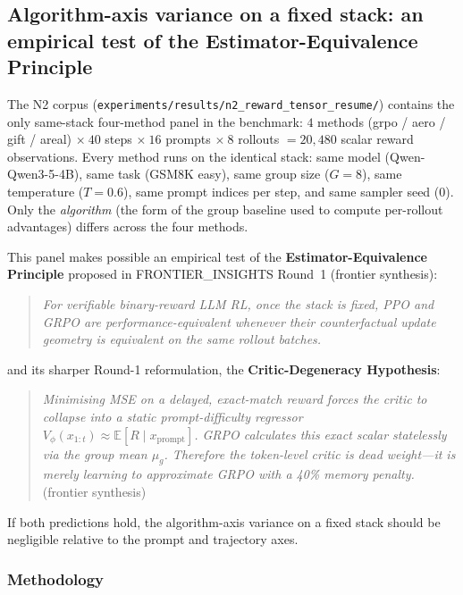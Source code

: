 \documentclass{article}  \usepackage[preprint,nonatbib]{neurips_2026} \usepackage[numbers]{natbib}
\begin{document}
\subsection{Algorithm-axis variance on a fixed stack: an empirical test of the
Estimator-Equivalence Principle}
\label{sec:p5-iter141-algo-axis}

The N2 corpus
(\texttt{experiments/results/n2\_reward\_tensor\_resume/}) contains the only
same-stack four-method panel in the benchmark:
$4$ methods (grpo / aero / gift / areal)
$\times\ 40$ steps
$\times\ 16$ prompts
$\times\ 8$ rollouts $= 20{,}480$ scalar reward observations.
Every method runs on the identical stack: same model
(Qwen-Qwen3-5-4B), same task (GSM8K easy), same group size ($G = 8$), same
temperature ($T = 0.6$), same prompt indices per step, and same sampler
seed ($0$). Only the \emph{algorithm} (the form of the group baseline used
to compute per-rollout advantages) differs across the four methods.

This panel makes possible an empirical test of the
\textbf{Estimator-Equivalence Principle} proposed in
FRONTIER\_INSIGHTS Round~1 (frontier synthesis):

\begin{quote}
\emph{For verifiable binary-reward LLM RL, once the stack is fixed, PPO and
GRPO are performance-equivalent whenever their counterfactual update
geometry is equivalent on the same rollout batches.}
\end{quote}

\noindent and its sharper Round-1 reformulation, the
\textbf{Critic-Degeneracy Hypothesis}:

\begin{quote}
\emph{Minimising MSE on a delayed, exact-match reward forces the critic to
collapse into a static prompt-difficulty regressor
$V_\phi(x_{1:t}) \approx \mathbb{E}[R \mid x_{\text{prompt}}]$. GRPO
calculates this exact scalar statelessly via the group mean $\mu_g$.
Therefore the token-level critic is dead weight---it is merely learning to
approximate GRPO with a 40\% memory penalty.} (frontier synthesis)
\end{quote}

If both predictions hold, the algorithm-axis variance on a fixed stack
should be negligible relative to the prompt and trajectory axes.

\subsubsection{Methodology}
\end{document}
